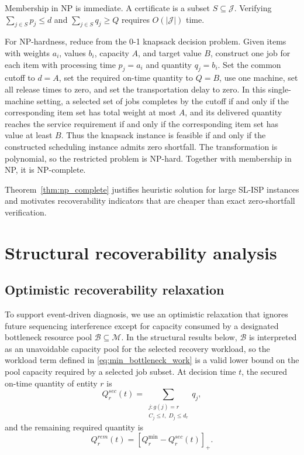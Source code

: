 \documentclass[a4paper,fleqn]{cas-sc}
\begin{document}
\begin{pf}
Membership in NP is immediate. A certificate is a subset \(S\subseteq\mathcal J\). Verifying \(\sum_{j\in S}p_j\le d\) and \(\sum_{j\in S}q_j\ge Q\) requires \(O(|\mathcal J|)\) time.

For NP-hardness, reduce from the 0-1 knapsack decision problem. Given items with weights \(a_i\), values \(b_i\), capacity \(A\), and target value \(B\), construct one job for each item with processing time \(p_j=a_i\) and quantity \(q_j=b_i\). Set the common cutoff to \(d=A\), set the required on-time quantity to \(Q=B\), use one machine, set all release times to zero, and set the transportation delay to zero. In this single-machine setting, a selected set of jobs completes by the cutoff if and only if the corresponding item set has total weight at most \(A\), and its delivered quantity reaches the service requirement if and only if the corresponding item set has value at least \(B\). Thus the knapsack instance is feasible if and only if the constructed scheduling instance admits zero shortfall. The transformation is polynomial, so the restricted problem is NP-hard. Together with membership in NP, it is NP-complete.
\end{pf}

Theorem~\ref{thm:np_complete} justifies heuristic solution for large SL-ISP instances and motivates recoverability indicators that are cheaper than exact zero-shortfall verification.

\section{Structural recoverability analysis}
\label{sec:recoverability}

\subsection{Optimistic recoverability relaxation}
\label{sec:optimistic_recoverability}

To support event-driven diagnosis, we use an optimistic relaxation that ignores future sequencing interference except for capacity consumed by a designated bottleneck resource pool \(\mathcal B\subseteq\mathcal M\). In the structural results below, \(\mathcal B\) is interpreted as an unavoidable capacity pool for the selected recovery workload, so the workload term defined in \eqref{eq:min_bottleneck_work} is a valid lower bound on the pool capacity required by a selected job subset. At decision time \(t\), the secured on-time quantity of entity \(r\) is
\begin{equation}
Q_r^{sec}(t)=
\sum_{\substack{j:g(j)=r\\ C_j\le t,\;D_j\le d_r}}q_j,
\label{eq:secured_quantity}
\end{equation}
and the remaining required quantity is
\begin{equation}
Q_r^{rem}(t)=
[Q_r^{\min}-Q_r^{sec}(t)]_+.
\label{eq:remaining_quantity}
\end{equation}
\end{document}
